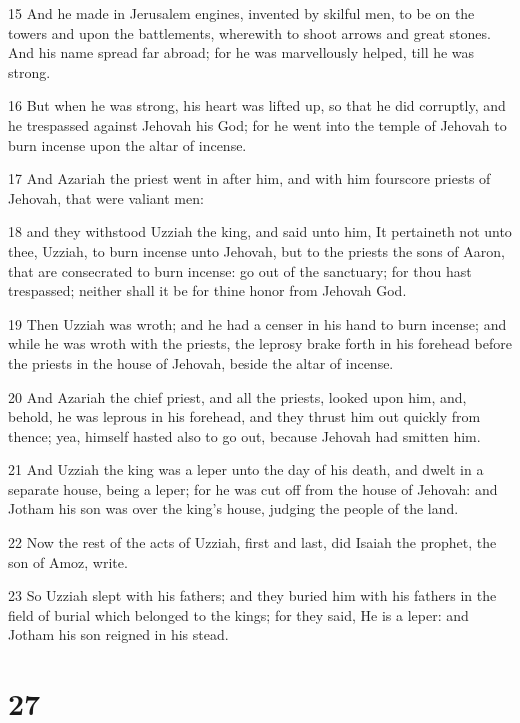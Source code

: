 \par 15 And he made in Jerusalem engines, invented by skilful men, to be on the towers and upon the battlements, wherewith to shoot arrows and great stones. And his name spread far abroad; for he was marvellously helped, till he was strong.
\par 16 But when he was strong, his heart was lifted up, so that he did corruptly, and he trespassed against Jehovah his God; for he went into the temple of Jehovah to burn incense upon the altar of incense.
\par 17 And Azariah the priest went in after him, and with him fourscore priests of Jehovah, that were valiant men:
\par 18 and they withstood Uzziah the king, and said unto him, It pertaineth not unto thee, Uzziah, to burn incense unto Jehovah, but to the priests the sons of Aaron, that are consecrated to burn incense: go out of the sanctuary; for thou hast trespassed; neither shall it be for thine honor from Jehovah God.
\par 19 Then Uzziah was wroth; and he had a censer in his hand to burn incense; and while he was wroth with the priests, the leprosy brake forth in his forehead before the priests in the house of Jehovah, beside the altar of incense.
\par 20 And Azariah the chief priest, and all the priests, looked upon him, and, behold, he was leprous in his forehead, and they thrust him out quickly from thence; yea, himself hasted also to go out, because Jehovah had smitten him.
\par 21 And Uzziah the king was a leper unto the day of his death, and dwelt in a separate house, being a leper; for he was cut off from the house of Jehovah: and Jotham his son was over the king's house, judging the people of the land.
\par 22 Now the rest of the acts of Uzziah, first and last, did Isaiah the prophet, the son of Amoz, write.
\par 23 So Uzziah slept with his fathers; and they buried him with his fathers in the field of burial which belonged to the kings; for they said, He is a leper: and Jotham his son reigned in his stead.

\chapter{27}

